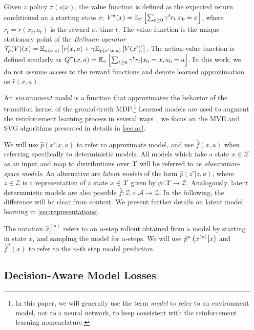 Given a policy $\pi(a|x)$, the value function is defined as the expected return conditioned on a starting state $x$: $V^\pi(x) = \mathbb{E}_{\pi}\left[  \sum_{t \geq 0} \gamma^t r_t|x_0 = x \right]$, where $r_t = r(x_t, a_t)$ is the reward at time $t$.
The value function is the unique stationary point of the \emph{Bellman operator} $\mathcal{T}_p(V)(x) = \mathbb{E}_{\pi(a|s)}\left[  r(x,a) + \gamma  \mathbb{E}_{p(x'|x,a)}\left[  V(x') \right] \right]$.
The action-value function is defined similarly as $Q^\pi(x,a) = \mathbb{E}_{\pi}\left[  \sum_{t \geq 0} \gamma^t r_t|x_0 = x, a_0 = a \right]$.
In this work, we do not assume access to the reward functions and denote learned approximation as $\hat{r}(x,a)$.

An \emph{environment model} is a function that approximates the behavior of the transition kernel of the ground-truth MDP.\footnote{In this paper, we will generally use the term \emph{model} to refer to an environment model, not to a neural network, to keep consistent with the reinforcement learning nomenclature.}
Learned models are used to augment the reinforcement learning process in several ways~\parencite{dyna,mbpo,Hafner2020Dream}, we focus on the MVE \parencite{buckman2018sample} and SVG \parencite{amos2021model} algorithms presented in details in \autoref{sec:ac}.

We will use $\hat{p}(x'|x,a)$ to refer to approximate model, and use $\hat{f}(x,a)$ when referring specifically to deterministic models.
All models which take a state $x\in\mathcal{X}$ as an input and map to distributions over $\mathcal{X}$ will be referred to as \emph{observation-space models}.
An alternative are \emph{latent models} of the form $\hat{p}(z'|z, a)$, where $z\in\mathcal{Z}$ is a representation of a state $x\in\mathcal{X}$ given by $\phi: \mathcal{X} \rightarrow \mathcal{Z}$.
Analogously, latent deterministic models are also possible $\hat{f}: \mathcal{Z} \times \mathcal{A} \rightarrow \mathcal{Z}$.
In the following, the difference will be clear from context.
We present further details on latent model learning in \autoref{sec:representations}.

The notation $\hat{x}^{(n)}_{i}$ refers to an $n$-step rollout obtained from a model by starting in state $x_{i}$ and sampling the model for $n$-steps.
We will use $\hat{p}^n\left( x^{(n)}\middle|x \right)$ and $\hat{f}^n(x)$ to refer to the $n$-th step model prediction.

\subsection{Decision-Aware Model Losses}
\label{sec:model_losses}

